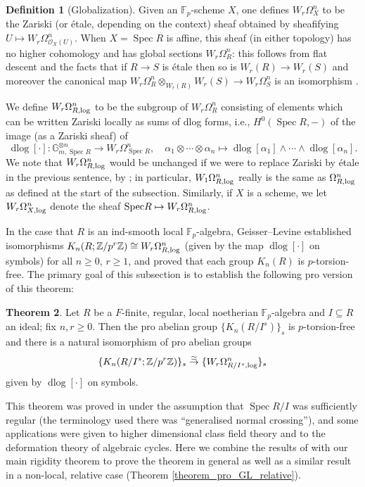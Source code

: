 \documentclass{amsart}
\newcommand{\spec}{\mathrm{Spec}}
\theoremstyle{definition}
\newtheorem{definition}{Definition}[section]
\newtheorem{theorem}[definition]{Theorem}
\newcommand{\bb}{\mathbb}
\newcommand{\isoto}{\stackrel{\simeq}{\to}}
\DeclareMathOperator{\dlog}{dlog}
\newcommand{\sub}[1]{{\mbox{\rm \scriptsize #1}}}
\DeclareMathOperator{\Spec}{Spec}
\newcommand{\al}{\alpha}
\begin{document}
\begin{definition}[Globalization]
Given an $\bb F_p$-scheme $X$, one defines $W_r\Omega^n_X$ to be the Zariski (or \'etale, depending on the context) sheaf obtained by sheafifying $U\mapsto W_r\Omega^n_{\mathcal O_X(U)}$. When $X=\Spec R$ is affine, this sheaf (in either topology) has no higher cohomology and has global sections $W_r\Omega_R^n$: this follows from flat descent and the facts that if $R\to S$ is \'etale then so is $W_r(R)\to W_r(S)$ \cite[Thm.~2.4]{vanderKallen1986} and moreover the canonical map $W_r\Omega_R^n\otimes_{W_r(R)}W_r(S)\to W_r\Omega_S^n$ is an isomorphism \cite[Prop.~1.7]{LangerZink2004}.

We define $W_r\Omega^n_{R,\sub{log}}$ to be the subgroup of $W_r\Omega^n_R$
consisting of elements which can be written Zariski locally as sums of dlog
forms, i.e., $H^0(\Spec R,-)$ of the image (as a Zariski sheaf) of
\[\dlog[\cdot]:\bb G_{m,\Spec R}^{\otimes n}\to W_r\Omega_{\Spec R}^n,\quad
\al_1\otimes\cdots\otimes\al_n\mapsto\dlog[\al_1]\wedge\cdots\wedge\dlog[\al_n].\]
We note that $W_r\Omega^n_{R,\sub{log}}$ would be unchanged if we were to
replace Zariski by \'etale in the previous sentence, by \cite[Cor. 
4.1(iii)]{Morrow-HW}; in particular, $W_1\Omega^n_{R,\sub{log}}$ really is the same as $\Omega^n_{R,\sub{log}}$ as defined at the start of the subsection. Similarly, if $X$ is a scheme, we let
$W_r \Omega_{X, \sub{log}}^n$ denote the sheaf $\spec R
\mapsto W_r \Omega^n_{R, \sub{log}}$. 
\end{definition}

In the case that $R$ is an ind-smooth local $\bb F_p$-algebra, Geisser--Levine
\cite{GL} established isomorphisms $K_n(R;\bb Z/p^r\bb Z)\cong W_r\Omega^n_{R,\sub{log}}$ (given by the map $\dlog[\cdot]$ on symbols) for all $n\ge0$, $r\ge1$, and proved that each group $K_n(R)$ is $p$-torsion-free. The primary goal of this subsection is to establish the following pro version of this theorem:

\begin{theorem}\label{theorem_pro_GL}
Let $R$ be a $F$-finite, regular, local noetherian $\bb F_p$-algebra and $I\subseteq R$ an ideal; fix $n,r\ge 0$. Then the pro abelian group $\{K_n(R/I^s)\}_s $ is $p$-torsion-free and there is a natural isomorphism of pro abelian groups \[\{K_n(R/I^s;\bb Z/p^r\bb Z)\}_s\isoto \{W_r\Omega^n_{R/I^s,\sub{log}}\}_s\] given by $\dlog[\cdot]$ on symbols.
\end{theorem}

This theorem was proved in \cite{Morrow-HW} under the assumption that $\Spec R/I$ was sufficiently regular (the terminology used there was ``generalised normal crossing''), and some applications were given to higher dimensional class field theory and to the deformation theory of algebraic cycles. Here we combine the results of \cite{Morrow-HW} with our main rigidity theorem to prove the theorem in general as well as a similar result in a non-local, relative case (Theorem \ref{theorem_pro_GL_relative}).
\end{document}
